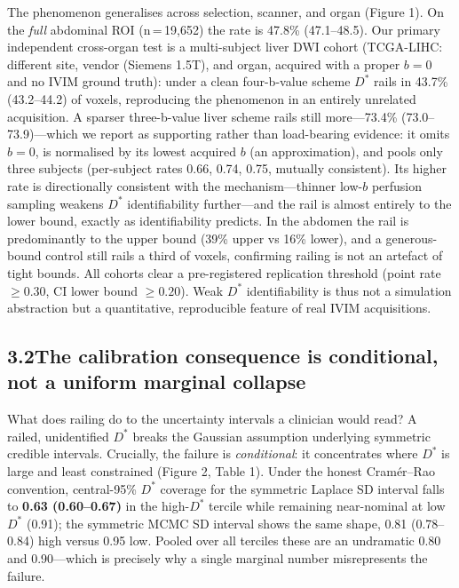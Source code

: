 \documentclass[11pt]{article}
\newcommand{\Dstar}{\ensuremath{D^{*}}}
\begin{document}
The phenomenon generalises across selection, scanner, and organ (Figure 1). On the
\emph{full} abdominal ROI (n\,=\,19{,}652) the rate is 47.8\% (47.1--48.5). Our
primary independent cross-organ test is a multi-subject liver DWI cohort (TCGA-LIHC:
different site, vendor (Siemens 1.5T), and organ, acquired with a proper $b=0$ and no
IVIM ground truth): under a clean four-b-value scheme \Dstar{} rails in 43.7\%
(43.2--44.2) of voxels, reproducing the phenomenon in an entirely unrelated acquisition.
A sparser three-b-value liver scheme rails still more---73.4\% (73.0--73.9)---which we
report as supporting rather than load-bearing evidence: it omits $b=0$, is normalised by
its lowest acquired $b$ (an approximation), and pools only three subjects (per-subject
rates 0.66, 0.74, 0.75, mutually consistent). Its higher rate is directionally consistent
with the mechanism---thinner low-$b$ perfusion sampling weakens \Dstar{} identifiability
further---and the rail is almost entirely to the lower bound, exactly as identifiability
predicts. In the abdomen the rail is predominantly
to the upper bound (39\% upper vs 16\% lower), and a generous-bound control still rails a
third of voxels, confirming railing is not an artefact of tight bounds. All cohorts clear
a pre-registered replication threshold (point rate $\ge 0.30$, CI lower bound
$\ge 0.20$). Weak \Dstar{} identifiability is thus not a simulation abstraction but a
quantitative, reproducible feature of real IVIM acquisitions.

\subsection*{3.2\quad The calibration consequence is conditional, not a uniform marginal collapse}

What does railing do to the uncertainty intervals a clinician would read? A railed,
unidentified \Dstar{} breaks the Gaussian assumption underlying symmetric credible
intervals. Crucially, the failure is \emph{conditional}: it concentrates where \Dstar{}
is large and least constrained (Figure 2, Table 1). Under the honest Cram\'er--Rao
convention, central-95\% \Dstar{} coverage for the symmetric Laplace SD interval falls to
\textbf{0.63 (0.60--0.67)} in the high-\Dstar{} tercile while remaining near-nominal at
low \Dstar{} (0.91); the symmetric MCMC SD interval shows the same shape, 0.81
(0.78--0.84) high versus 0.95 low. Pooled over all terciles these are an undramatic 0.80
and 0.90---which is precisely why a single marginal number misrepresents the failure.
\end{document}
